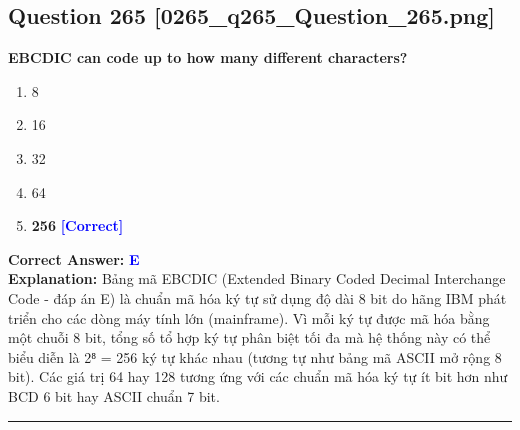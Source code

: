 \documentclass[11pt,a4paper]{article}
\begin{document}
\begin{minipage}{\textwidth}
\subsection*{Question 265 \quad \footnotesize{[0265\_q265\_Question\_265.png]}}
\noindent \textbf{EBCDIC can code up to how many different characters?}

\begin{enumerate}[label=\Alph*.]
    \item 8
    \item 16
    \item 32
    \item 64
    \item \textbf{256} \hfill \textcolor{blue}{\textbf{[Correct]}}
\end{enumerate}

\noindent \textbf{Correct Answer:} \textcolor{blue}{\textbf{E}} \\[2pt]
\noindent \textbf{Explanation:} Bảng mã EBCDIC (Extended Binary Coded Decimal Interchange Code - đáp án E) là chuẩn mã hóa ký tự sử dụng độ dài 8 bit do hãng IBM phát triển cho các dòng máy tính lớn (mainframe). Vì mỗi ký tự được mã hóa bằng một chuỗi 8 bit, tổng số tổ hợp ký tự phân biệt tối đa mà hệ thống này có thể biểu diễn là 2⁸ = 256 ký tự khác nhau (tương tự như bảng mã ASCII mở rộng 8 bit). Các giá trị 64 hay 128 tương ứng với các chuẩn mã hóa ký tự ít bit hơn như BCD 6 bit hay ASCII chuẩn 7 bit.

\par\vspace{0.3cm}
\hrule
\vspace{0.3cm}
\end{minipage}
\end{document}
